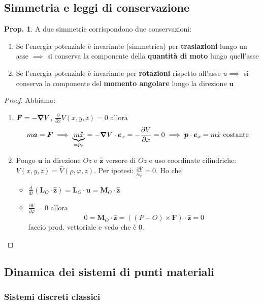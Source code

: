 \documentclass[a4paper,10pt]{article}
\theoremstyle{definition}
\newcommand{\bv}{\boldsymbol} %
\theoremstyle{indentdefinition}
\theoremstyle{indenttheorem}
\newtheorem{prop}{Prop.}
\theoremstyle{myremark}
\theoremstyle{indentgeneral}
\begin{document}
\subsection{Simmetria e leggi di conservazione}
\begin{prop} A due simmetrie corrispondono due conservazioni:
\begin{enumerate}
    \item Se l'energia potenziale è invariante (simmetrica) per \textbf{traslazioni} lungo un asse $\implies$ si conserva la componente della \textbf{quantità di moto} lungo quell'asse
    \item  Se l'energia potenziale è invariante per \textbf{rotazioni} rispetto all'asse $u \implies$ si conserva la componente del \textbf{momento angolare} lungo la direzione $\bv{u}$
\end{enumerate}
\end{prop}
\begin{proof}
Abbiamo:
\begin{enumerate}
    \item $\bv{F}=-\grad V$, $\frac{\partial}{\partial x}V(x,y,z)=0$ allora
    $$m\bv{a}=\bv{F}\implies \underbrace{m\ddot{x}}_{=\dot{p}_x}=-\grad V\cdot\bv{e}_x=-\frac{\partial V}{\partial x}=0 \implies \bv{p}\cdot\bv{e}_x=m\dot{x} \text{ costante}$$
    \item Pongo $\bv{u}$ in direzione $Oz$ e $\hat{\bv{z}}$ versore di $Oz$ e uso coordinate cilindriche: $V(x,y,z)=\widehat{V}(\rho,\varphi,z)$. Per ipotesi: $\frac{\partial\widehat{V}}{\partial\varphi}=0$. Ho che
    \begin{itemize}
        \item $\frac{d}{dt}(\bv{L}_O\cdot\hat{\bv{z}})=\dot{\bv{L}}_O\cdot\bv{u}=\bv{M}_O\cdot\hat{\bv{z}}$
        \item  $\frac{\partial\widehat{V}}{\partial\varphi}=0$ allora
        $$0=\bv{M}_O\cdot\hat{\bv{z}}=((P-O)\times\bv{F})\cdot\hat{\bv{z}}=0$$
        faccio prod. vettoriale e vedo che è 0.
    \end{itemize}
\end{enumerate}
\end{proof}

\subsection{Dinamica dei sistemi di punti materiali}

\subsubsection{Sistemi discreti classici}
\end{document}

